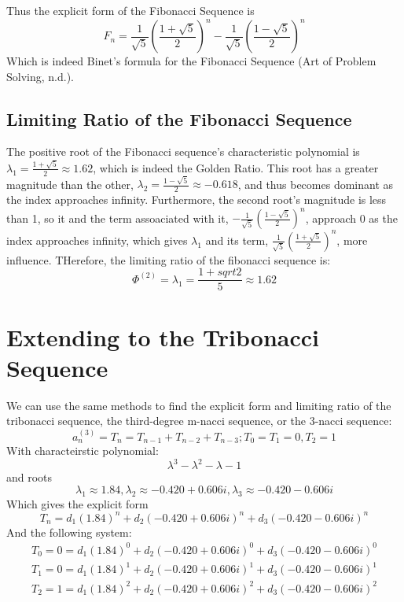 \documentclass[11pt]{article}
\begin{document}
Thus the explicit form of the Fibonacci Sequence is
    \[F_n=\frac{1}{\sqrt{5}}\left(\frac{1+\sqrt{5}}{2}\right)^n-\frac{1}{\sqrt{5}}\left(\frac{1-\sqrt{5}}{2}\right)^n\]
Which is indeed Binet's formula for the Fibonacci Sequence (Art of Problem Solving, n.d.).

\subsection{Limiting Ratio of the Fibonacci Sequence}
The positive root of the Fibonacci sequence's characteristic polynomial is $\lambda_1=\frac{1+\sqrt{5}}{2}\approx 1.62$, which is indeed the Golden Ratio. This root has a greater magnitude than the other, $\lambda_2=\frac{1-\sqrt{5}}{2}\approx-0.618$, and thus becomes dominant as the index approaches infinity. Furthermore, the second root's magnitude is less than 1, so it and the term assoaciated with it, \(-\frac{1}{\sqrt{5}}\left(\frac{1-\sqrt{5}}{2}\right)^n\), approach 0 as the index approaches infinity, which gives \(\lambda_1\) and its term, \(\frac{1}{\sqrt{5}}\left(\frac{1+\sqrt{5}}{2}\right)^n\), more influence. THerefore, the limiting ratio of the fibonacci sequence is:
\[\Phi^{(2)}=\lambda_1=\frac{1+sqrt{2}}{5}\approx1.62\]



\section{Extending to the Tribonacci Sequence}
We can use the same methods to find the explicit form and limiting ratio of the tribonacci sequence, the third-degree m-nacci sequence, or the 3-nacci sequence:
$$a_{n}^{(3)}=T_n=T_{n-1}+T_{n-2}+T_{n-3};T_0=T_1=0, T_2=1$$
With characteirstic polynomial:
\[\lambda^3-\lambda^2-\lambda-1\]
and roots
\[\lambda_1 \approx 1.84, \lambda_2 \approx -0.420 + 0.606i, \lambda_3 \approx -0.420 - 0.606i\]
Which gives the explicit form
\[T_n=d_1(1.84)^n+d_2(-0.420 + 0.606i)^n+d_3(-0.420 - 0.606i)^n\]
And the following system:
\begin{align*}
    T_0=0=d_1(1.84)^0+d_2(-0.420 + 0.606i)^0+d_3(-0.420 - 0.606i)^0 \\
    T_1=0=d_1(1.84)^1+d_2(-0.420 + 0.606i)^1+d_3(-0.420 - 0.606i)^1 \\
    T_2=1=d_1(1.84)^2+d_2(-0.420 + 0.606i)^2+d_3(-0.420 - 0.606i)^2
\end{align*}
\end{document}
